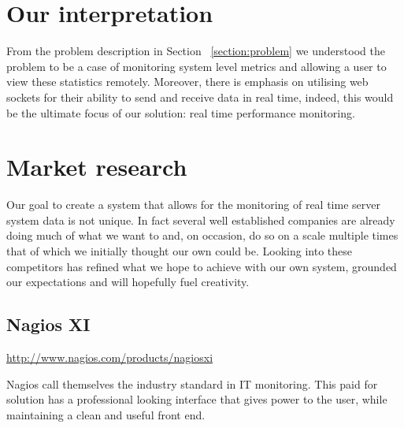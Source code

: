 \documentclass{l3proj}
\begin{document}

\section{Our interpretation}


From the problem description in Section ~\ref{section:problem} we understood the problem to be a case of monitoring system level metrics and allowing a user to view these statistics remotely. Moreover, there is emphasis on utilising web sockets for their ability to send and receive data in real time, indeed, this would be the ultimate focus of our solution: real time performance monitoring.


\section{Market research}
\label{section:MarketResearch}


Our goal to create a system that allows for the monitoring of real time server system data is not unique. In fact several well established companies are already doing much of what we want to and, on occasion, do so on a scale multiple times that of which we initially thought our own could be. Looking into these competitors has refined what we hope to achieve with our own system, grounded our expectations and will hopefully fuel creativity.

\subsection{Nagios XI}

\url{http://www.nagios.com/products/nagiosxi}

Nagios call themselves the industry standard in IT monitoring. This paid for solution has a professional looking interface that gives power to the user, while maintaining a clean and useful front end.
\end{document}
